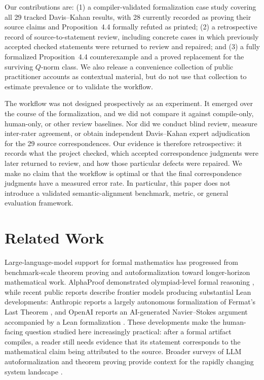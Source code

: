 \documentclass{article}
\begin{document}
Our contributions are: (1) a compiler-validated formalization case study
covering all 29 tracked Davis--Kahan results, with 28 currently recorded as proving
their source claims and Proposition~4.4 formally refuted as printed; (2) a
retrospective record of source-to-statement review, including concrete cases in
which previously accepted checked statements were returned to review and repaired; and
(3) a fully formalized Proposition~4.4 counterexample and a proved replacement
for the surviving $Q$-norm class.  We also release a convenience collection of
public practitioner accounts as contextual material, but do not use that
collection to estimate prevalence or to validate the workflow.

The workflow was not designed prospectively as an experiment.  It emerged over
the course of the formalization, and we did not compare it against compile-only,
human-only, or other review baselines.  Nor did we conduct blind review,
measure inter-rater agreement, or obtain independent Davis--Kahan expert
adjudication for the 29 source correspondences.  Our evidence is therefore
retrospective: it records what the project checked, which accepted
correspondence judgments were later returned to review, and how those particular defects
were repaired.  We make no claim that the workflow is optimal or that the final
correspondence judgments have a measured error rate.  In particular, this paper
does not introduce a validated semantic-alignment benchmark, metric, or general
evaluation framework.


\section{Related Work}
\label{sec:related}

Large-language-model support for formal mathematics has progressed from
benchmark-scale theorem proving and autoformalization toward longer-horizon
mathematical work.  AlphaProof demonstrated olympiad-level formal reasoning
\citep{hubert2026alphaproof}, while recent public reports describe frontier
models producing substantial Lean developments: Anthropic reports a largely autonomous
formalization of Fermat's Last Theorem \citep{anthropic2026flt}, and OpenAI
reports an AI-generated Navier--Stokes argument accompanied by a Lean
formalization \citep{openai2026navierstokes}.  These developments make the
human-facing question studied here increasingly practical: after a formal
artifact compiles, a reader still needs evidence that its statement corresponds
to the mathematical claim being attributed to the source.  Broader surveys of
LLM autoformalization and theorem proving provide context for the rapidly
changing system landscape \citep{weng2025survey}.
\end{document}
